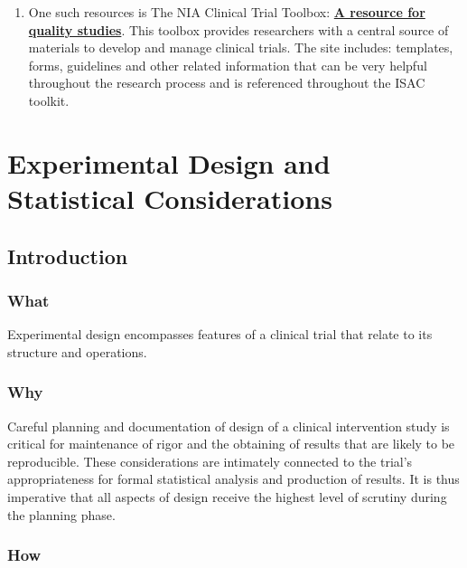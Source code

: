 \documentclass[]{book}
\providecommand{\tightlist}{%
  \setlength{\itemsep}{0pt}\setlength{\parskip}{0pt}}
\theoremstyle{definition}
\theoremstyle{definition}
\theoremstyle{definition}
\theoremstyle{remark}
\begin{document}
\begin{enumerate}
\def\labelenumi{\arabic{enumi}.}
\tightlist
\item
  One such resources is The NIA Clinical Trial Toolbox:
  \href{https://www.nia.nih.gov/research/blog/2016/10/nia-clinical-trial-toolbox-resource-quality-studies}{\textbf{A
  resource for quality studies}}. This toolbox provides researchers with
  a central source of materials to develop and manage clinical trials.
  The site includes: templates, forms, guidelines and other related
  information that can be very helpful throughout the research process
  and is referenced throughout the ISAC toolkit.
\end{enumerate}

\chapter{Experimental Design and Statistical
Considerations}\label{experimental-design-and-statistical-considerations}

\section{Introduction}\label{introduction-1}

\subsection{What}\label{what}

Experimental design encompasses features of a clinical trial that relate
to its structure and operations.

\subsection{Why}\label{why}

Careful planning and documentation of design of a clinical intervention
study is critical for maintenance of rigor and the obtaining of results
that are likely to be reproducible. These considerations are intimately
connected to the trial's appropriateness for formal statistical analysis
and production of results. It is thus imperative that all aspects of
design receive the highest level of scrutiny during the planning phase.

\subsection{How}\label{how}
\end{document}
